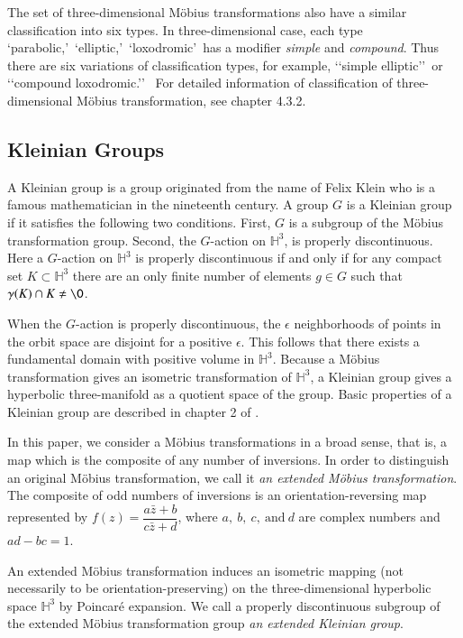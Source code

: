 The set of three-dimensional M\"obius transformations also have a similar
classification into six types.
In three-dimensional case, each type \lq parabolic,\rq~\lq elliptic,\rq~\lq loxodromic\rq~has 
a modifier \textit{simple} and \textit{compound}.
Thus there are six variations of classification types, for example, \lq\lq simple elliptic\rq\rq~or
\lq\lq compound loxodromic.\rq\rq~
For detailed information of classification of three-dimensional M\"obius transformation, see chapter 4.3.2.

\subsection{Kleinian Groups}

A Kleinian group is a group originated from the name of Felix Klein who is
a famous mathematician in the nineteenth century.
A group $G$ is a Kleinian group if it satisfies the following two
conditions. 
First, $G$ is a subgroup of the M\"obius transformation group.
Second, the $G$-action on $\mathbb{H}^3$,
is properly discontinuous.
Here a $G$-action on $\mathbb{H}^3$
is properly discontinuous if and only if
for any compact set $K \subset \mathbb{H}^3$
there are an only finite number of elements $g \in G$ such that
$\gamma (K) \cap K \neq \O$.

\noindent When the $G$-action is properly discontinuous, 
the $\epsilon$ neighborhoods of points in the orbit space are disjoint
for a positive $\epsilon$.
This follows that there exists a
fundamental domain with positive volume in $\mathbb{H}^3$.
Because a M\"obius transformation gives an isometric transformation of
$\mathbb{H}^3$, a Kleinian group gives a hyperbolic three-manifold 
as a quotient space of the group. 
Basic properties of a Kleinian group are described in chapter 2 of \cite{marden_2016}.

In this paper, we consider a M\"obius transformations in a broad sense, that is,
a map which is the composite of
any number of inversions.
In order to distinguish an original M\"obius transformation,
we call it \textit{an extended M\"obius transformation}.
The composite of odd numbers of inversions
is an orientation-reversing map represented by $f(z)=\dfrac{a{\bar{z}}+b}{c{\bar{z}}+d}$, where
$a,~b,~c,~\text{and}~d$ are complex numbers and $ad-bc = 1$.

An extended M\"obius transformation induces an isometric mapping 
(not necessarily to be orientation-preserving) on the three-dimensional hyperbolic space $\mathbb{H}^3$ by
Poincar\'e expansion.
We call a properly discontinuous subgroup of the extended M\"obius transformation group
\textit{an extended Kleinian group}.

